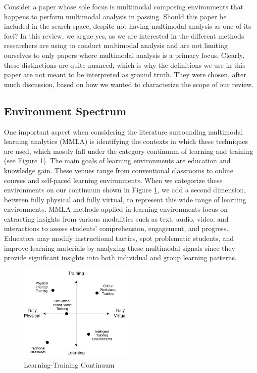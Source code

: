 \documentclass[manuscript,screen,review]{acmart}
\begin{document}
Consider a paper whose sole focus is multimodal composing environments that happens to perform multimodal analysis in passing. Should this paper be included in the search space, despite not having multimodal analysis as one of its foci? In this review, we argue yes, as we are interested in the different methods researchers are using to conduct multimodal analysis and are not limiting ourselves to only papers where multimodal analysis is a primary focus. Clearly, these distinctions are quite nuanced, which is why the definitions we use in this paper are not meant to be interpreted as ground truth. They were chosen, after much discussion, based on how we wanted to characterize the scope of our review.


\subsection{Environment Spectrum}\label{subsec:environmentSpectrum} %


One important aspect when considering the literature surrounding multimodal learning analytics (MMLA) is identifying the contexts in which these techniques are used, which mostly fall under the category continuum of learning and training (see Figure \ref{fig:ltcontinuum}). The main goals of learning environments are education and knowledge gain. These venues range from conventional classrooms to online courses and self-paced learning environments. When we categorize these environments on our continuum shown in Figure \ref{fig:ltcontinuum}, we add a second dimension, between fully physical and fully virtual, to represent this wide range of learning environments. MMLA methods applied in learning environments focus on extracting insights from various modalities such as text, audio, video, and interactions to assess students' comprehension, engagement, and progress. Educators may modify instructional tactics, spot problematic students, and improve learning materials by analyzing these multimodal signals since they provide significant insights into both individual and group learning patterns.

\begin{figure}
    \centering
    \includegraphics[width=0.5\textwidth]{img/LearningTrainingContinuum.jpg}
    \caption{Learning-Training Continuum}
    \label{fig:ltcontinuum}
\end{figure}
\end{document}
